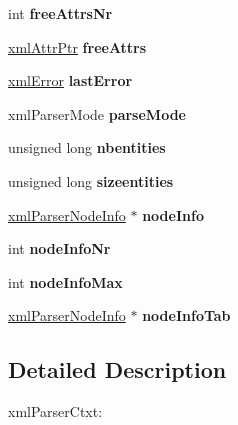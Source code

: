 \begin{DoxyCompactItemize}
\mbox{\label{struct__xml_parser_ctxt_a505367ee1fc8289be00afd4217a169be}} 
int {\bfseries free\+Attrs\+Nr}
\item 
\mbox{\label{struct__xml_parser_ctxt_ac5c4d7b54b7e19da0256b7eacb5a159b}} 
\mbox{\hyperlink{struct__xml_attr}{xml\+Attr\+Ptr}} {\bfseries free\+Attrs}
\item 
\mbox{\label{struct__xml_parser_ctxt_a06c58f3bc22c0d7c1ce76d607a5f44a9}} 
\mbox{\hyperlink{struct__xml_error}{xml\+Error}} {\bfseries last\+Error}
\item 
\mbox{\label{struct__xml_parser_ctxt_a000fedcc192734e86f5d4544b7ef12e1}} 
xml\+Parser\+Mode {\bfseries parse\+Mode}
\item 
\mbox{\label{struct__xml_parser_ctxt_ae54fcad8c5b2a1a99a3f2600ff6fbd20}} 
unsigned long {\bfseries nbentities}
\item 
\mbox{\label{struct__xml_parser_ctxt_ac33f4970b6a6c6d44d6af6b3e75c1cba}} 
unsigned long {\bfseries sizeentities}
\item 
\mbox{\label{struct__xml_parser_ctxt_a94cfb5fca39a2f7799401ce839d56fa5}} 
\mbox{\hyperlink{struct__xml_parser_node_info}{xml\+Parser\+Node\+Info}} $\ast$ {\bfseries node\+Info}
\item 
\mbox{\label{struct__xml_parser_ctxt_afa9973d4413dc9c5258beaf8630d4482}} 
int {\bfseries node\+Info\+Nr}
\item 
\mbox{\label{struct__xml_parser_ctxt_aa60d004e3a010df0d860323babb6292b}} 
int {\bfseries node\+Info\+Max}
\item 
\mbox{\label{struct__xml_parser_ctxt_aefdcb34e692fd2f6925e9bb76c6765df}} 
\mbox{\hyperlink{struct__xml_parser_node_info}{xml\+Parser\+Node\+Info}} $\ast$ {\bfseries node\+Info\+Tab}
\end{DoxyCompactItemize}


\subsection{Detailed Description}
xml\+Parser\+Ctxt\+:

